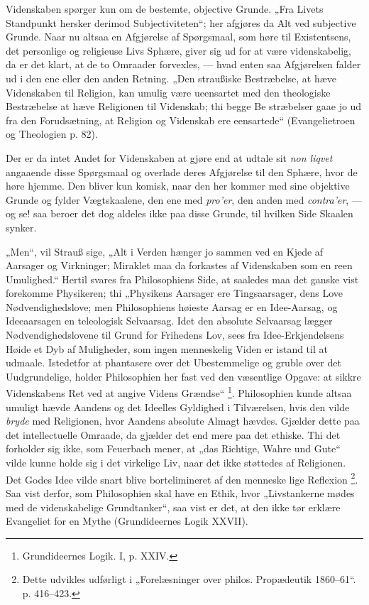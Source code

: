 \documentclass[12pt,a4paper]{book}
\newcommand{\opage}[1]{\marginnote{\footnotesize\textit{[#1]}}}
\begin{document}
Videnskaben spørger kun om de bestemte, objective Grunde.
„Fra Livets Standpunkt hersker derimod Subjectiviteten“; her
afgjøres da Alt ved subjective Grunde. Naar nu altsaa en
Afgjørelse af Spørgsmaal, som høre til Existentsens, det personlige
og religieuse Livs Sphære, giver sig ud for at være
videnskabelig, da er det klart, at de to Omraader forvexles,
--- hvad enten saa Afgjørelsen falder ud i den ene eller den anden
Retning. „Den straußiske Bestræbelse, at hæve Videnskaben til
Religion, kan umulig være ueensartet med den theologiske
Bestræbelse at hæve Religionen til Videnskab; thi begge Be%
\opage{39}\setcounter{footnote}{0}%
stræbelser gaae jo ud fra den Forudsætning, at Religion og
Videnskab ere eensartede“ (Evangelietroen og Theologien p. 82).

Der er da intet Andet for Videnskaben at gjøre end at
udtale sit \textit{non liqvet} angaaende disse Spørgsmaal og overlade
deres Afgjørelse til den Sphære, hvor de høre hjemme. Den
bliver kun komisk, naar den her kommer med sine objektive
Grunde og fylder Vægtskaalene, den ene med \textit{pro'er}, den
anden med \textit{contra'er}, --- og se! saa beroer det dog aldeles
ikke paa disse Grunde, til hvilken Side Skaalen synker.

„Men“, vil Strauß sige, „Alt i Verden hænger jo sammen
ved en Kjede af Aarsager og Virkninger; Miraklet maa da
forkastes af Videnskaben som en reen Umulighed.“ Hertil
svares fra Philosophiens Side, at saaledes maa det ganske
vist forekomme Physikeren; thi „Physikens Aarsager ere Tingsaarsager,
dens Love Nødvendighedslove; men Philosophiens
høieste Aarsag er en Idee-Aarsag, og Ideeaarsagen en teleologisk
Selvaarsag. Idet den absolute Selvaarsag lægger Nødvendighedslovene
til Grund for Frihedens Lov, sees fra Idee-Erkjendelsens
Høide et Dyb af Muligheder, som ingen menneskelig
Viden er istand til at udmaale. Istedetfor at phantasere
over det Ubestemmelige og gruble over det Uudgrundelige,
holder Philosophien her fast ved den væsentlige Opgave:
at sikkre Videnskabens Ret ved at angive Videns Grændse“%
\footnote{Grundideernes Logik. I, p. XXIV.}.
Philosophien kunde altsaa umuligt hævde Aandens og det
Ideelles Gyldighed i Tilværelsen, hvis den vilde \emph{bryde} med
Religionen, hvor Aandens absolute Almagt hævdes. Gjælder
dette paa det intellectuelle Omraade, da gjælder det end mere
paa det ethiske. Thi det forholder sig ikke, som Feuerbach
mener, at „das Richtige, Wahre und Gute“ vilde kunne holde
sig i det virkelige Liv, naar det ikke støttedes af Religionen.
Det Godes Idee vilde snart blive bortelimineret af den menneske\-%
\opage{40}\setcounter{footnote}{0}%
lige Reflexion%
\footnote{Dette udvikles udførligt i „Forelæsninger over philos. Propædeutik
1860--61“. p. 416--423.}. Saa vist derfor, som Philosophien skal
have en Ethik, hvor „Livstankerne mødes med de videnskabelige
Grundtanker“, saa vist er det, at den ikke tør erklære Evangeliet
for en Mythe (Grundideernes Logik XXVII).
\end{document}
